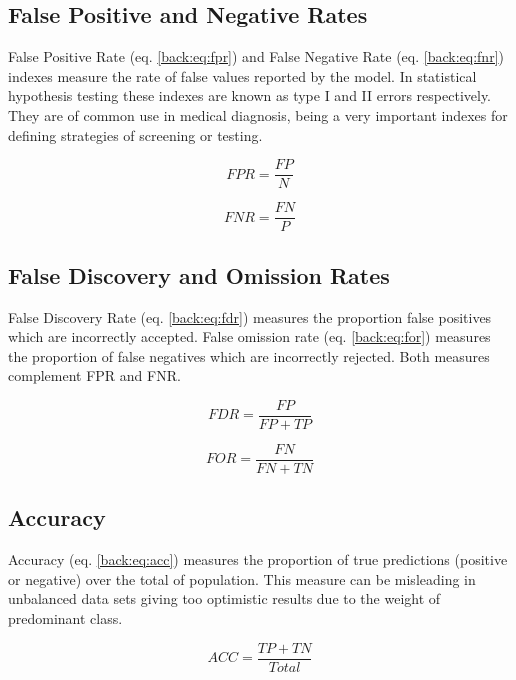 \subsection{False Positive and Negative Rates}

False Positive Rate (eq. \ref{back:eq:fpr}) and False Negative Rate (eq. \ref{back:eq:fnr}) indexes measure the rate of false values reported by the model. In statistical hypothesis testing these indexes are known as type I and II errors respectively. They are of common use in medical diagnosis, being a very important indexes for defining strategies of screening or testing.

\begin{equation}
FPR=\frac{FP}{N}
\label{back:eq:fpr}
\end{equation}

\begin{equation}
FNR=\frac{FN}{P}
\label{back:eq:fnr}
\end{equation}

\subsection{False Discovery and Omission Rates}

False Discovery Rate (eq. \ref{back:eq:fdr}) measures the proportion false positives which are incorrectly accepted. False omission rate (eq. \ref{back:eq:for}) measures the proportion of false negatives which are incorrectly rejected. Both measures complement FPR and FNR.

\begin{equation}
FDR=\frac{FP}{FP+TP}
\label{back:eq:fdr}
\end{equation}

\begin{equation}
FOR=\frac{FN}{FN+TN}
\label{back:eq:for}
\end{equation}

\subsection{Accuracy}

Accuracy (eq. \ref{back:eq:acc}) measures the proportion of true predictions (positive or negative) over the total of population. This measure can be misleading in unbalanced data sets giving too optimistic results due to the weight of predominant class.

\begin{equation}
ACC=\frac{TP+TN}{Total}
\label{back:eq:acc}
\end{equation}

